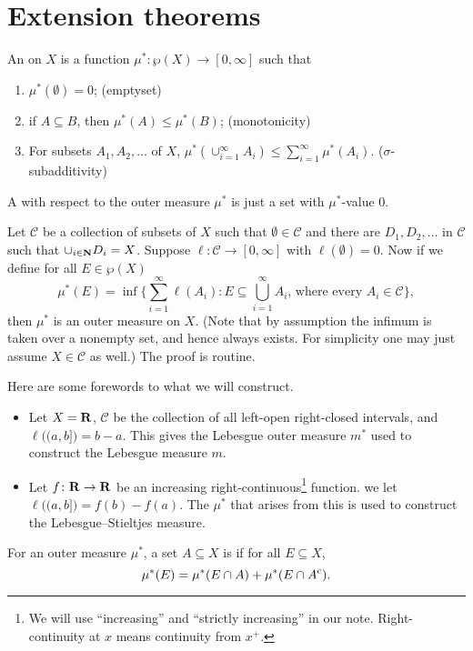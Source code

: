 \section{Extension theorems}
\begin{defn}
    An  on $X$ is a function $\mu^{*}\colon\wp(X)\to[0,\infty]$ such that 
    \begin{enumerate}
    \item $\mu^{*}(\emptyset)=0$; (emptyset)
    \item if $A\subseteq B$, then $\mu^{*}(A)\leq\mu^{*}(B)$; (monotonicity)
    \item For subsets $A_{1},A_{2},\dotsc$ of $X$, $\mu^{*}(\cup_{i=1}^{\infty}A_{i})\leq\sum_{i=1}^{\infty}\mu^{*}(A_{i})$. ($\sigma$-subadditivity)
    \end{enumerate}
    A  with respect to the outer measure $\mu^{*}$ is just a set with $\mu^{*}$-value 0.
\end{defn}

Let $\mathcal{C}$ be a collection of subsets of $X$ such that $\emptyset\in\mathcal{C}$ and there are $D_{1},D_{2},\dotsc$ in $\mathcal{C}$ such that $\cup_{i\in\mathbf{N}}D_{i}=X$. Suppose $\ell\colon\mathcal{C}\to[0,\infty]$ with $\ell(\emptyset)=0$. Now if we define for all $E\in \wp(X)$ 
\[
    \mu^{*}(E)=\inf\biggl\{\sum_{i=1}^{\infty}\ell(A_{i}):E\subseteq\bigcup_{i=1}^{\infty}A_{i}\text{, where every }A_{i}\in\mathcal{C}\biggr\},
\]
then $\mu^{*}$ is an outer measure on $X$. (Note that by assumption
the infimum is taken over a nonempty set, and hence always exists. For simplicity one may just assume $X \in \mathcal{C}$ as well.)
The proof is routine.

    Here are some forewords to what we will construct.
\begin{itemize}
\item Let $X=\mathbf{R}$, $\mathcal{C}$ be the collection of all left-open right-closed
intervals, and $\ell\bigl((a,b]\bigr)=b-a$. This gives the Lebesgue
outer measure $m^{*}$ used to construct the Lebesgue measure $m$.
\item Let $f\colon\mathbf{R}\to\mathbf{R}$ be an increasing right-continuous\footnote{We will use ``increasing'' and ``strictly increasing'' in our note. Right-continuity at $x$ means continuity from $x^{+}$.}
function. we let $\ell\bigl((a,b]\bigr)=f(b)-f(a)$. The $\mu^{*}$
that arises from this is used to construct the Lebesgue--Stieltjes measure.
\end{itemize}

\begin{defn}
    For an outer measure $\mu^{*}$, a set $A\subseteq X$ is  if for all $E\subseteq X$, \[
        \mu^{*}(E)=\mu^{*}(E\cap A)+\mu^{*}(E\cap A^{\mathrm{c}}).
    \] 
\end{defn}

